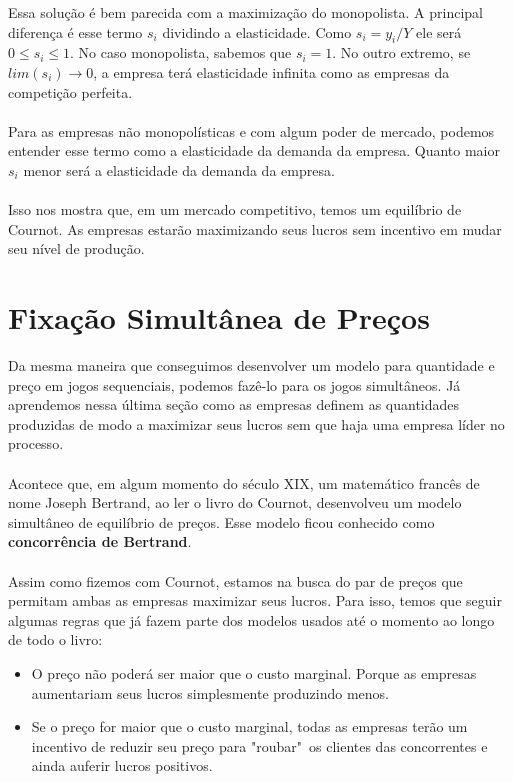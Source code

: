 \documentclass[a4paper,11pt,oneside]{book}
\theoremstyle{definition}
\theoremstyle{break}
\begin{document}
Essa solução é bem parecida com a maximização do monopolista. A principal diferença é esse termo $s_i$ dividindo a elasticidade. Como $s_i = y_i/Y$ ele será $0 \leq s_i \leq 1$. No caso monopolista, sabemos que $s_i = 1$. No outro extremo, se $lim (s_i) \rightarrow 0$, a empresa terá elasticidade infinita como as empresas da competição perfeita.  
\\
\\
Para as empresas não monopolísticas e com algum poder de mercado, podemos entender esse termo como a elasticidade da demanda da empresa. Quanto maior $s_i$ menor será a elasticidade da demanda da empresa.
\\
\\
Isso nos mostra que, em um mercado competitivo, temos um equilíbrio de Cournot. As empresas estarão maximizando seus lucros sem incentivo em mudar seu nível de produção.

\section{Fixação Simultânea de Preços}

Da mesma maneira que conseguimos desenvolver um modelo para quantidade e preço em jogos sequenciais, podemos fazê-lo para os jogos simultâneos. Já aprendemos nessa última seção como as empresas definem as quantidades produzidas de modo a maximizar seus lucros sem que haja uma empresa líder no processo.
\\
\\
Acontece que, em algum momento do século XIX, um matemático francês de nome Joseph Bertrand, ao ler o livro do Cournot, desenvolveu um modelo simultâneo de equilíbrio de preços. Esse modelo ficou conhecido como \textbf{concorrência de Bertrand}.
\\
\\
Assim como fizemos com Cournot, estamos na busca do par de preços que permitam ambas as empresas maximizar seus lucros. Para isso, temos que seguir algumas regras que já fazem parte dos modelos usados até o momento ao longo de todo o livro:

\begin{itemize}
\item O preço não poderá ser maior que o custo marginal. Porque as empresas aumentariam seus lucros simplesmente produzindo menos.
\item Se o preço for maior que o custo marginal, todas as empresas terão um incentivo de reduzir seu preço para "roubar"\ os clientes das concorrentes e ainda auferir lucros positivos.
\end{itemize}
\end{document}
